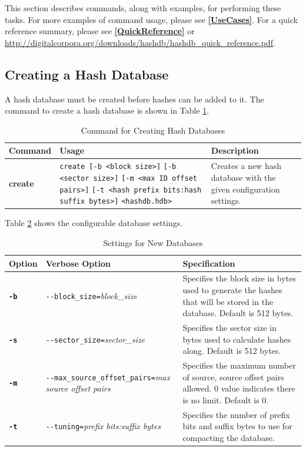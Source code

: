 \documentclass[11pt,fleqn]{article} %
\begin{document}
This section describes \hdb commands, along with examples, for performing these tasks.
For more examples of command usage, please see \textbf{\autoref{UseCases}}.
For a \hdb quick reference summary, please see \textbf{\autoref{QuickReference}}
or \url{http://digitalcorpora.org/downloads/hashdb/hashdb_quick_reference.pdf}.

\subsection{Creating a Hash Database}
A hash database must be created before hashes can be added to it.
The command to create a hash database is shown in Table \ref{tab:createDatabase}.
\begin{table}[!ht]
\centering
\caption{Command for Creating Hash Databases}
\label{tab:createDatabase}
\begin{tabular}{|p{2.5 cm}|p{7 cm}|p{4 cm}|}
\hline \hline
\textbf{Command} & \textbf{Usage} & \textbf{Description} \\
\hline
\textbf{create} & \verb+create [-b <block size>]+ \verb+[-b <sector size>]+ \verb+[-m <max ID offset pairs>]+ \verb+[-t <hash prefix bits:hash+ \verb+suffix bytes>]+ \verb+<hashdb.hdb>+ & Creates a new hash database with the given configuration settings.\\
\hline
\end{tabular}
\end{table}

Table \ref{tab:hashDBSettings} shows the configurable database settings.\\

\begin{table}[!ht]
\centering
\caption{Settings for New Databases}
\label{tab:hashDBSettings}
\begin{tabular}{|p{1.5 cm}|p{8 cm}|p{4 cm}|}
\hline \hline
\textbf{Option} & \textbf{Verbose Option} & \textbf{Specification} \\
\hline
\textbf{\texttt{-b}} & \verb+--block_size=+\textit{block\_size} & Specifies the block size in bytes used to generate the hashes that will be stored in the database. Default is 512 bytes.  \\
\hline
\textbf{\texttt{-s}} & \verb+--sector_size=+\textit{sector\_size} & Specifies the sector size in bytes used to calculate hashes along. Default is 512 bytes.  \\
\hline
\textbf{\texttt{-m}} & \verb+--max_source_offset_pairs=+\textit{max source offset pairs} & Specifies the maximum number of source, source offset pairs allowed. 0 value indicates there is no limit. Default is 0.\\
\hline
\textbf{\texttt{-t}} & \verb+--tuning=+\textit{prefix bits:suffix bytes} & Specifies the number of prefix bits and suffix bytes to use for compacting the database.\\
\hline
\end{tabular}
\end{table}
\end{document}
